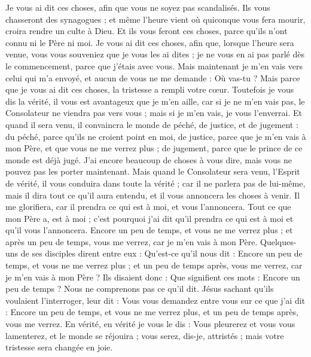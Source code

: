\begin{multicols}{2}
\VerseOne{}Je vous ai dit ces choses, afin que vous ne soyez pas scandalisés.
Ils vous chasseront des synagogues ; et même l'heure vient où quiconque vous fera mourir, croira rendre un culte à Dieu.
Et ils vous feront ces choses, parce qu'ils n'ont connu ni le Père ni moi.
Je vous ai dit ces choses, afin que, lorsque l'heure sera venue, vous vous souveniez que je vous les ai dites ; je ne vous en ai pas parlé dès le commencement, parce que j'étais avec vous.
Mais maintenant je m'en vais vers celui qui m'a envoyé, et aucun de vous ne me demande : Où vas-tu ?
Mais parce que je vous ai dit ces choses, la tristesse a rempli votre cœur.
Toutefois je vous dis la vérité, il vous est avantageux que je m'en aille, car si je ne m'en vais pas, le Consolateur ne viendra pas vers vous ; mais si je m'en vais, je vous l'enverrai.
Et quand il sera venu, il convaincra le monde de péché, de justice, et de jugement :
du péché, parce qu'ils ne croient point en moi,
de justice, parce que je m'en vais à mon Père, et que vous ne me verrez plus ;
de jugement, parce que le prince de ce monde est déjà jugé.
J'ai encore beaucoup de choses à vous dire, mais vous ne pouvez pas les porter maintenant.
Mais quand le Consolateur sera venu, l'Esprit de vérité, il vous conduira dans toute la vérité ; car il ne parlera pas de lui-même, mais il dira tout ce qu'il aura entendu, et il vous annoncera les choses à venir.
Il me glorifiera, car il prendra ce qui est à moi, et vous l'annoncera.
Tout ce que mon Père a, est à moi ; c'est pourquoi j'ai dit qu'il prendra ce qui est à moi et qu'il vous l'annoncera.
Encore un peu de temps, et vous ne me verrez plus ; et après un peu de temps, vous me verrez, car je m'en vais à mon Père.
Quelques-uns de ses disciples dirent entre eux : Qu'est-ce qu'il nous dit : Encore un peu de temps, et vous ne me verrez plus ; et un peu de temps après, vous me verrez, car je m'en vais à mon Père ?
Ils disaient donc : Que signifient ces mots : Encore un peu de temps ? Nous ne comprenons pas ce qu'il dit.
Jésus sachant qu'ils voulaient l'interroger, leur dit : Vous vous demandez entre vous sur ce que j'ai dit : Encore un peu de temps, et vous ne me verrez plus, et un peu de temps après, vous me verrez.
En vérité, en vérité je vous le dis : Vous pleurerez et vous vous lamenterez, et le monde se réjouira ; vous serez, dis-je, attristés ; mais votre tristesse sera changée en joie.

\end{multicols}

